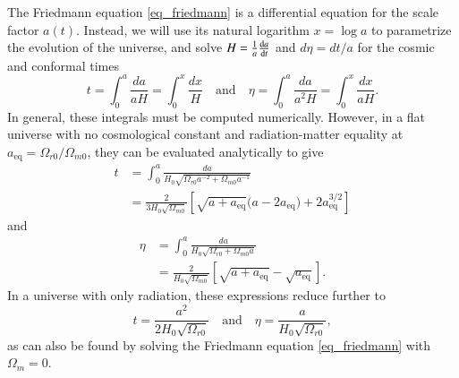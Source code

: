 \documentclass{aa}
\begin{document}
The Friedmann equation \eqref{eq_friedmann} is a differential equation for the scale factor $a(t)$.
Instead, we will use its natural logarithm $x = \log a$ to parametrize the evolution of the universe,
and solve $H = \frac1a \odv{a}{t}$ and $d\eta = dt / a$ for the cosmic and conformal times
\begin{equation}
	t = \int_0^a \frac{da}{aH} = \int_0^x \frac{dx}{H}
	\quad \text{and} \quad
	\eta = \int_0^a \frac{da}{a^2 H} = \int_0^x \frac{dx}{aH}.
\label{eq_cosmic_conformal_time}
\end{equation}
In general, these integrals must be computed numerically.
However, in a flat universe with no cosmological constant and radiation-matter equality at $a_\text{eq} = \Omega_{r0}/\Omega_{m0}$,
they can be evaluated analytically to give
\begin{equation}
\begin{aligned}
	t &= \int_0^a \frac{da}{H_0 \sqrt{\Omega_{r0}a^{-2} + \Omega_{m0}a^{-1}}} \\
	  &=  \frac{2}{3 H_0 \sqrt{\Omega_{m0}}} \left[\sqrt{a + a_\text{eq}} \big(a - 2 a_\text{eq}\big) + 2 a_\text{eq}^{3/2} \right]
\end{aligned}
\label{eq_cosmic_time_anal}
\end{equation}
and
\begin{equation}
\begin{aligned}
	\eta &= \int_0^a \frac{da}{H_0 \sqrt{\Omega_{r0} + \Omega_{m0} a}} \\
		 &= \frac{2}{H_0 \sqrt{\Omega_{m0}}} \left[ \sqrt{a + a_\text{eq}} - \sqrt{a_\text{eq}}\right].
\end{aligned}
\label{eq_conformal_time_anal}
\end{equation}
In a universe with only radiation, these expressions reduce further to
\begin{equation}
	t = \frac{a^2}{2 H_0 \sqrt{\Omega_{r0}}}
	\quad \text{and} \quad
	\eta = \frac{a}{H_0 \sqrt{\Omega_{r0}}},
\label{eq_cosmic_conformal_time_anal}
\end{equation}
as can also be found by solving the Friedmann equation \eqref{eq_friedmann} with $\Omega_{m} = 0$.
\end{document}
